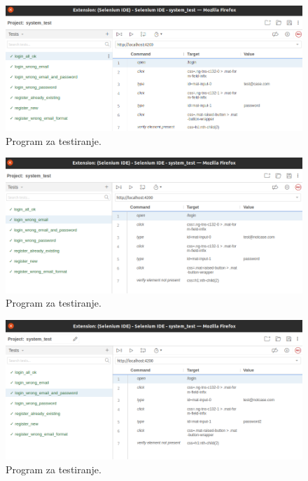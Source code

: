 			\eject 

           \begin{figure}[H]
                \includegraphics[width=\textwidth]{slike/tests_system/login_all_ok.png} %
                \caption{Program za testiranje.}
                \label{fig:struktura} %
            \end{figure}

            \begin{figure}[H]
                \includegraphics[width=\textwidth]{slike/tests_system/login_wrong_email.png} %
                \caption{Program za testiranje.}
                \label{fig:struktura} %
            \end{figure}

            \begin{figure}[H]
                \includegraphics[width=\textwidth]{slike/tests_system/login_wrong_email_and_password.png} %
                \caption{Program za testiranje.}
                \label{fig:struktura} %
            \end{figure}

